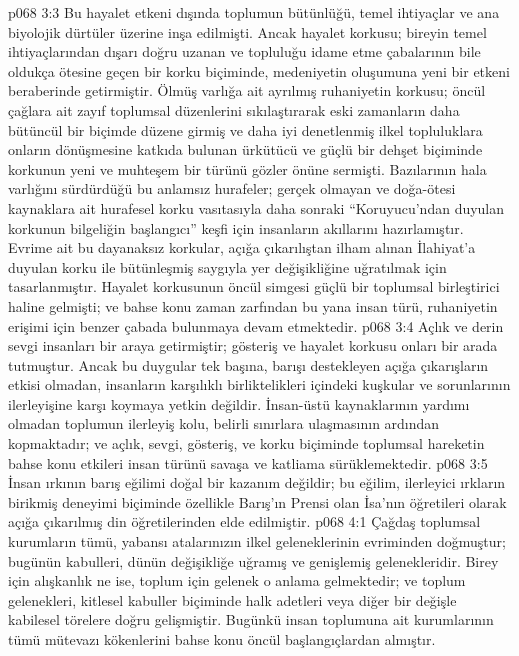 \vs p068 3:3 Bu hayalet etkeni dışında toplumun bütünlüğü, temel ihtiyaçlar ve ana biyolojik dürtüler üzerine inşa edilmişti. Ancak hayalet korkusu; bireyin temel ihtiyaçlarından dışarı doğru uzanan ve topluluğu idame etme çabalarının bile oldukça ötesine geçen bir korku biçiminde, medeniyetin oluşumuna yeni bir etkeni beraberinde getirmiştir. Ölmüş varlığa ait ayrılmış ruhaniyetin korkusu; öncül çağlara ait zayıf toplumsal düzenlerini sıkılaştırarak eski zamanların daha bütüncül bir biçimde düzene girmiş ve daha iyi denetlenmiş ilkel topluluklara onların dönüşmesine katkıda bulunan ürkütücü ve güçlü bir dehşet biçiminde korkunun yeni ve muhteşem bir türünü gözler önüne sermişti. Bazılarının hala varlığını sürdürdüğü bu anlamsız hurafeler; gerçek olmayan ve doğa\hyp{}ötesi kaynaklara ait hurafesel korku vasıtasıyla daha sonraki “Koruyucu’ndan duyulan korkunun bilgeliğin başlangıcı” keşfi için insanların akıllarını hazırlamıştır. Evrime ait bu dayanaksız korkular, açığa çıkarılıştan ilham alınan İlahiyat’a duyulan korku ile bütünleşmiş saygıyla yer değişikliğine uğratılmak için tasarlanmıştır. Hayalet korkusunun öncül simgesi güçlü bir toplumsal birleştirici haline gelmişti; ve bahse konu zaman zarfından bu yana insan türü, ruhaniyetin erişimi için benzer çabada bulunmaya devam etmektedir.
\vs p068 3:4 Açlık ve derin sevgi insanları bir araya getirmiştir; gösteriş ve hayalet korkusu onları bir arada tutmuştur. Ancak bu duygular tek başına, barışı destekleyen açığa çıkarışların etkisi olmadan, insanların karşılıklı birliktelikleri içindeki kuşkular ve sorunlarının ilerleyişine karşı koymaya yetkin değildir. İnsan\hyp{}üstü kaynaklarının yardımı olmadan toplumun ilerleyiş kolu, belirli sınırlara ulaşmasının ardından kopmaktadır; ve açlık, sevgi, gösteriş, ve korku biçiminde toplumsal hareketin bahse konu etkileri insan türünü savaşa ve katliama sürüklemektedir.
\vs p068 3:5 İnsan ırkının barış eğilimi doğal bir kazanım değildir; bu eğilim, ilerleyici ırkların birikmiş deneyimi biçiminde özellikle Barış’ın Prensi olan İsa’nın öğretileri olarak açığa çıkarılmış din öğretilerinden elde edilmiştir.
\vs p068 4:1 Çağdaş toplumsal kurumların tümü, yabansı atalarınızın ilkel geleneklerinin evriminden doğmuştur; bugünün kabulleri, dünün değişikliğe uğramış ve genişlemiş gelenekleridir. Birey için alışkanlık ne ise, toplum için gelenek o anlama gelmektedir; ve toplum gelenekleri, kitlesel kabuller biçiminde halk adetleri veya diğer bir değişle kabilesel törelere doğru gelişmiştir. Bugünkü insan toplumuna ait kurumlarının tümü mütevazı kökenlerini bahse konu öncül başlangıçlardan almıştır.

